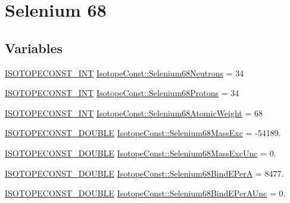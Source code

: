 \hypertarget{group___isotope_const-_selenium-_se68}{}\section{Selenium 68}
\label{group___isotope_const-_selenium-_se68}
\subsection*{Variables}
\begin{DoxyCompactItemize}
\item 
\mbox{\hyperlink{group___isotope_const-_macros_ga5f18360b3e99483a35c32d789e62621c}{I\+S\+O\+T\+O\+P\+E\+C\+O\+N\+S\+T\+\_\+\+I\+NT}} \mbox{\hyperlink{group___isotope_const-_selenium-_se68_ga7d4707a4e7404c75e82249b72da73705}{Isotope\+Const\+::\+Selenium68\+Neutrons}} = 34
\item 
\mbox{\hyperlink{group___isotope_const-_macros_ga5f18360b3e99483a35c32d789e62621c}{I\+S\+O\+T\+O\+P\+E\+C\+O\+N\+S\+T\+\_\+\+I\+NT}} \mbox{\hyperlink{group___isotope_const-_selenium-_se68_ga68b3d30144fb6903f69e1c4c6c58465d}{Isotope\+Const\+::\+Selenium68\+Protons}} = 34
\item 
\mbox{\hyperlink{group___isotope_const-_macros_ga5f18360b3e99483a35c32d789e62621c}{I\+S\+O\+T\+O\+P\+E\+C\+O\+N\+S\+T\+\_\+\+I\+NT}} \mbox{\hyperlink{group___isotope_const-_selenium-_se68_ga8e6daba64122f44c349fda91a86e2efa}{Isotope\+Const\+::\+Selenium68\+Atomic\+Weight}} = 68
\item 
\mbox{\hyperlink{group___isotope_const-_macros_ga8f45a7272ce02c0b4c65c44636ed719a}{I\+S\+O\+T\+O\+P\+E\+C\+O\+N\+S\+T\+\_\+\+D\+O\+U\+B\+LE}} \mbox{\hyperlink{group___isotope_const-_selenium-_se68_ga8b3794abb817ae62775d8203038e5ab0}{Isotope\+Const\+::\+Selenium68\+Mass\+Exc}} = -\/54189.
\item 
\mbox{\hyperlink{group___isotope_const-_macros_ga8f45a7272ce02c0b4c65c44636ed719a}{I\+S\+O\+T\+O\+P\+E\+C\+O\+N\+S\+T\+\_\+\+D\+O\+U\+B\+LE}} \mbox{\hyperlink{group___isotope_const-_selenium-_se68_gaf2a722bd0616d2ed3c1ca0dd50732c0d}{Isotope\+Const\+::\+Selenium68\+Mass\+Exc\+Unc}} = 0.
\item 
\mbox{\hyperlink{group___isotope_const-_macros_ga8f45a7272ce02c0b4c65c44636ed719a}{I\+S\+O\+T\+O\+P\+E\+C\+O\+N\+S\+T\+\_\+\+D\+O\+U\+B\+LE}} \mbox{\hyperlink{group___isotope_const-_selenium-_se68_ga319de709d101381d836f92fc857708a2}{Isotope\+Const\+::\+Selenium68\+Bind\+E\+PerA}} = 8477.
\item 
\mbox{\hyperlink{group___isotope_const-_macros_ga8f45a7272ce02c0b4c65c44636ed719a}{I\+S\+O\+T\+O\+P\+E\+C\+O\+N\+S\+T\+\_\+\+D\+O\+U\+B\+LE}} \mbox{\hyperlink{group___isotope_const-_selenium-_se68_ga06c58c6c95cd8fc5ceeaf04849722ae3}{Isotope\+Const\+::\+Selenium68\+Bind\+E\+Per\+A\+Unc}} = 0.

\end{DoxyCompactItemize}
